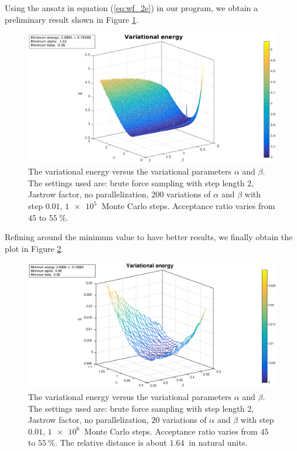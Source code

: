 \documentclass[a4paper,twoside,11pt]{book}
\begin{document}
Using the ansatz in equation (\ref{eq:wf_2e}) in our program, we obtain a preliminary result shown in Figure \ref{fig:2e_rep}.

\begin{figure}[H]
	\centering
	\includegraphics[width=\textwidth]{2e-rep}
	\caption{The variational energy versus the variational parameters $\alpha$ and $\beta$. The settings used are: brute force sampling with step length 2, Jastrow factor, no parallelization, $200$ variations of $\alpha$ and $\beta$ with step $0.01$, $\SI{1e5}{}$ Monte Carlo steps. Acceptance ratio varies from $45$ to $\SI{55}{\percent}$.}
	\label{fig:2e_rep}
\end{figure}

Refining around the minimum value to have better results, we finally obtain the plot in Figure \ref{fig:2e_rep_fine}.

\begin{figure}[H]
	\centering
	\includegraphics[width=\textwidth]{2e-rep_fine}
	\caption{The variational energy versus the variational parameters $\alpha$ and $\beta$. The settings used are: brute force sampling with step length 2, Jastrow factor, no parallelization, $20$ variations of $\alpha$ and $\beta$ with step $0.01$, $\SI{1e6}{}$ Monte Carlo steps. Acceptance ratio varies from $45$ to $\SI{55}{\percent}$. The relative distance is about $\SI{1.64}{}$ in natural units.}
	\label{fig:2e_rep_fine}
\end{figure}
\end{document}
